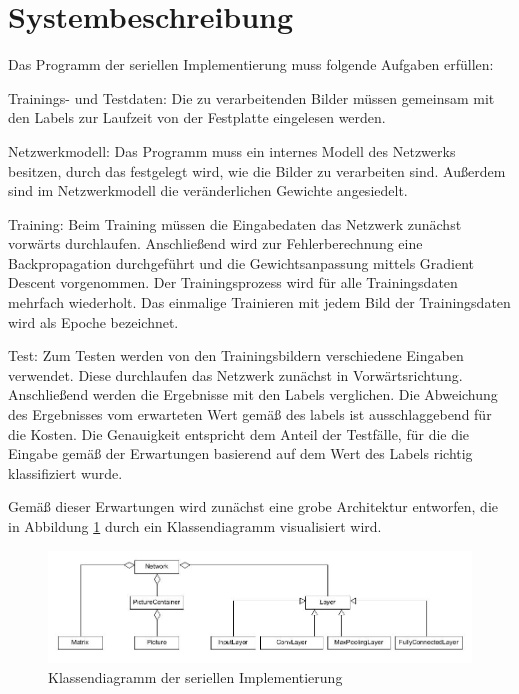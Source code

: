 \documentclass[../main.tex]{subfiles}
\begin{document}
\section{Systembeschreibung}
Das Programm der seriellen Implementierung muss folgende Aufgaben erfüllen: 
\begin{description}
\item{Trainings- und Testdaten:} Die zu verarbeitenden Bilder müssen gemeinsam mit den Labels zur Laufzeit von der Festplatte eingelesen werden. 
\item{Netzwerkmodell:} Das Programm muss ein internes Modell des Netzwerks besitzen, durch das festgelegt wird, wie die Bilder zu verarbeiten sind. Außerdem sind im Netzwerkmodell die veränderlichen Gewichte angesiedelt. 
\item{Training:} Beim Training müssen die Eingabedaten das Netzwerk zunächst vorwärts durchlaufen. Anschließend wird zur Fehlerberechnung eine Backpropagation durchgeführt und die Gewichtsanpassung mittels Gradient Descent vorgenommen. 
Der Trainingsprozess wird für alle Trainingsdaten mehrfach wiederholt. Das einmalige Trainieren mit jedem Bild der Trainingsdaten wird als Epoche bezeichnet. 
\item{Test:} Zum Testen werden von den Trainingsbildern verschiedene Eingaben verwendet. Diese durchlaufen das Netzwerk zunächst in Vorwärtsrichtung. Anschließend werden die Ergebnisse mit den Labels verglichen. Die Abweichung des Ergebnisses vom erwarteten Wert gemäß des labels ist ausschlaggebend für die Kosten. Die Genauigkeit entspricht dem Anteil der Testfälle, für die die Eingabe gemäß der Erwartungen basierend auf dem Wert des Labels richtig klassifiziert wurde. 
\end{description}
Gemäß dieser Erwartungen wird zunächst eine grobe Architektur entworfen, die in Abbildung \ref{pic:cnn_serial_classes} durch ein Klassendiagramm visualisiert wird. 
\begin{figure}
    \centering 
       \includegraphics[width=\textwidth]{../images/Schmidt/CNN_Serial_Classes.jpg} 
    \caption {Klassendiagramm der seriellen Implementierung} 
    \label{pic:cnn_serial_classes} 
\end{figure} 
\end{document}
